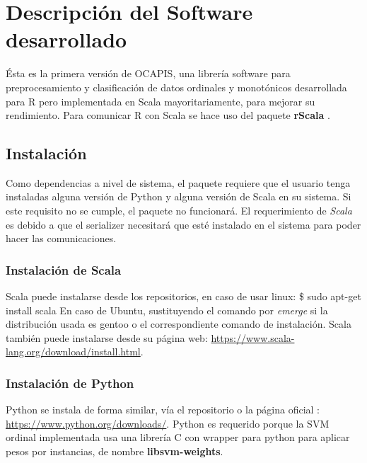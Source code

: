 
\chapter{Descripción del Software desarrollado}

Ésta es la primera versión de OCAPIS, una librería software para preprocesamiento y clasificación de datos ordinales y monotónicos desarrollada para R pero implementada en Scala mayoritariamente, para mejorar su rendimiento. Para comunicar R con Scala se hace uso del paquete \textbf{rScala} \cite{dahlintegration}.

\section{Instalación}
Como dependencias a nivel de sistema, el paquete requiere que el usuario tenga instaladas alguna versión de Python y alguna versión de Scala en su sistema. Si este requisito no se cumple, el paquete no funcionará. El requerimiento de \textit{Scala} es debido a que el serializer necesitará que esté instalado en el sistema para poder hacer las comunicaciones. 
\subsection{Instalación de Scala}
Scala puede instalarse desde los repositorios, en caso de usar linux:
\vspace{3pt}
\hline
\vspace{7pt}
 \$ sudo apt-get install scala
 \vspace{7pt}
 \hline
 \vspace{3pt}
En caso de Ubuntu, sustituyendo el comando por \textit{emerge} si la distribución usada es gentoo o el correspondiente comando de instalación. Scala también puede instalarse desde su página web: \url{https://www.scala-lang.org/download/install.html}. \newline

\subsection{Instalación de Python}
Python se instala de forma similar, vía el repositorio o la página oficial : \url{https://www.python.org/downloads/}. Python es requerido porque la SVM ordinal implementada usa una librería C con wrapper para python para aplicar pesos por instancias, de nombre \textbf{libsvm-weights}.

